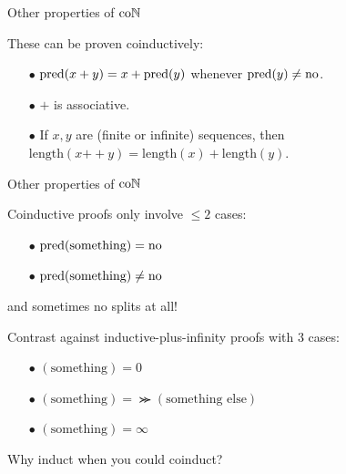 
\begin{frame}{Other properties of $\mathrm{co}\mathbb{N}$} %

  \par These can be proven coinductively:
  \begin{itemize}
    \item[$\bullet$] {
      $\operatorname{pred}(x + y) = x + \operatorname{pred}(y)$ whenever $\operatorname{pred}(y) \neq \mathrm{no}$.
    }
    \item[$\bullet$] {
      $+$ is associative.
    }
    \item[$\bullet$] {
      If $x, y$ are (finite or infinite) sequences, then $\mathrm{length}(x \mathbin{++} y) = \mathrm{length}(x) + \mathrm{length}(y)$.
    }
  \end{itemize}
  
\end{frame}

\begin{frame}{Other properties of $\mathrm{co}\mathbb{N}$} %

  \par Coinductive proofs only involve $\leq 2$ cases:
  \begin{itemize}
    \item[$\bullet$] $\operatorname{pred}(\text{something}) = \mathrm{no}$
    \item[$\bullet$] $\operatorname{pred}(\text{something}) \neq \mathrm{no}$
  \end{itemize}
  and sometimes no splits at all!

  \pause

  \vspace{\baselineskip}
  
  \par Contrast against inductive-plus-infinity proofs with $3$ cases:
  \begin{itemize}
    \item[$\bullet$] $(\text{something}) = 0$
    \item[$\bullet$] $(\text{something}) = \Succ(\text{something else})$
    \item[$\bullet$] $(\text{something}) = \infty$
  \end{itemize}
  
  \vspace{\baselineskip}
  
  \par Why induct when you could coinduct?
  
\end{frame}